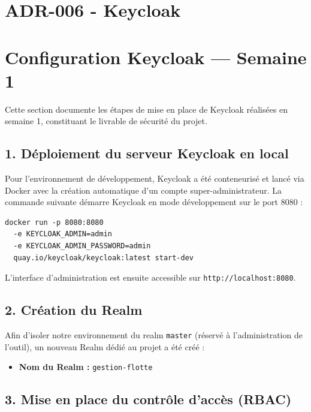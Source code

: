\documentclass[10pt,a4paper]{article}
\begin{document}
\section{ADR-006 - Keycloak}

\newpage
 
\section{Configuration Keycloak --- Semaine 1}
 
Cette section documente les étapes de mise en place de Keycloak réalisées en semaine 1, constituant le livrable de sécurité du projet.
 
\subsection{1. Déploiement du serveur Keycloak en local}
 
Pour l'environnement de développement, Keycloak a été conteneurisé et lancé via Docker avec la création automatique d'un compte super-administrateur. La commande suivante démarre Keycloak en mode développement sur le port 8080 :
 
\begin{verbatim}
docker run -p 8080:8080
  -e KEYCLOAK_ADMIN=admin
  -e KEYCLOAK_ADMIN_PASSWORD=admin
  quay.io/keycloak/keycloak:latest start-dev
\end{verbatim}
 
L'interface d'administration est ensuite accessible sur \texttt{http://localhost:8080}.
 
\subsection{2. Création du Realm}
 
Afin d'isoler notre environnement du realm \texttt{master} (réservé à l'administration de l'outil), un nouveau Realm dédié au projet a été créé :
 
\begin{itemize}[noitemsep]
  \item \textbf{Nom du Realm :} \texttt{gestion-flotte}
\end{itemize}
 
\subsection{3. Mise en place du contrôle d'accès (RBAC)}
 
\end{document}
